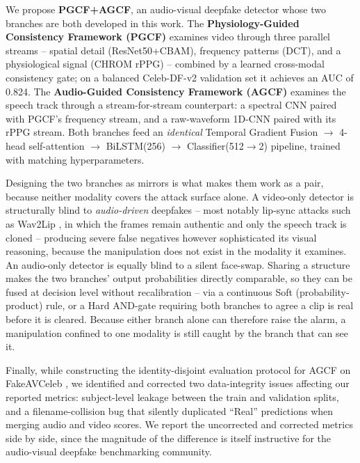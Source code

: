 \documentclass[conference]{IEEEtran}
\begin{document}
We propose \textbf{PGCF+AGCF}, an audio-visual deepfake detector whose two branches are both developed in this work. The \textbf{Physiology-Guided Consistency Framework (PGCF)} examines video through three parallel streams -- spatial detail (ResNet50+CBAM), frequency patterns (DCT), and a physiological signal (CHROM rPPG) -- combined by a learned cross-modal consistency gate; on a balanced Celeb-DF-v2 validation set it achieves an AUC of 0.824. The \textbf{Audio-Guided Consistency Framework (AGCF)} examines the speech track through a stream-for-stream counterpart: a spectral CNN paired with PGCF's frequency stream, and a raw-waveform 1D-CNN paired with its rPPG stream. Both branches feed an \emph{identical} Temporal Gradient Fusion $\to$ 4-head self-attention $\to$ BiLSTM(256) $\to$ Classifier(512$\to$2) pipeline, trained with matching hyperparameters.

Designing the two branches as mirrors is what makes them work as a pair, because neither modality covers the attack surface alone. A video-only detector is structurally blind to \emph{audio-driven} deepfakes -- most notably lip-sync attacks such as Wav2Lip \cite{prajwal2020wav2lip}, in which the frames remain authentic and only the speech track is cloned -- producing severe false negatives however sophisticated its visual reasoning, because the manipulation does not exist in the modality it examines. An audio-only detector is equally blind to a silent face-swap. Sharing a structure makes the two branches' output probabilities directly comparable, so they can be fused at decision level without recalibration -- via a continuous Soft (probability-product) rule, or a Hard AND-gate requiring both branches to agree a clip is real before it is cleared. Because either branch alone can therefore raise the alarm, a manipulation confined to one modality is still caught by the branch that can see it.

Finally, while constructing the identity-disjoint evaluation protocol for AGCF on FakeAVCeleb \cite{khalid2021fakeavceleb}, we identified and corrected two data-integrity issues affecting our reported metrics: subject-level leakage between the train and validation splits, and a filename-collision bug that silently duplicated ``Real'' predictions when merging audio and video scores. We report the uncorrected and corrected metrics side by side, since the magnitude of the difference is itself instructive for the audio-visual deepfake benchmarking community.
\end{document}
